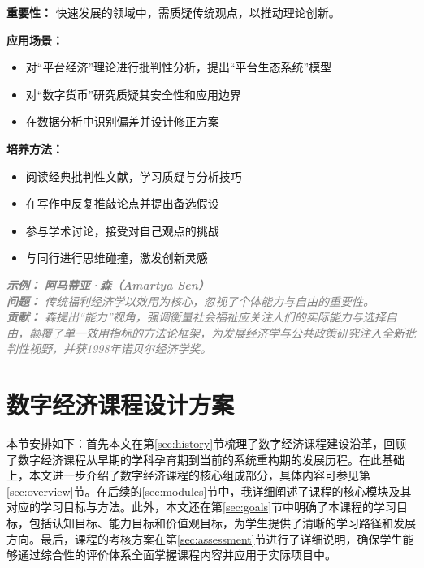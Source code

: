 \documentclass[lang=cn,12pt,a4paper]{elegantpaper}
\newcommand{\skillexample}[1]{\smallskip\noindent\textcolor{gray}{\textit{\footnotesize\textbf{示例：}} \textit{\footnotesize #1}}}
\begin{document}
\textbf{重要性：} 快速发展的领域中，需质疑传统观点，以推动理论创新。

\textbf{应用场景：} 
\begin{itemize}
    \item 对“平台经济”理论进行批判性分析，提出“平台生态系统”模型
    \item 对“数字货币”研究质疑其安全性和应用边界
    \item 在数据分析中识别偏差并设计修正方案
\end{itemize}

\textbf{培养方法：}
\begin{itemize}
    \item 阅读经典批判性文献，学习质疑与分析技巧
    \item 在写作中反复推敲论点并提出备选假设
    \item 参与学术讨论，接受对自己观点的挑战
    \item 与同行进行思维碰撞，激发创新灵感
\end{itemize}

\skillexample{%
\textbf{阿马蒂亚·森（Amartya Sen）}\\
\textbf{问题：} 传统福利经济学以效用为核心，忽视了个体能力与自由的重要性。\\
\textbf{贡献：} 森提出“能力”视角，强调衡量社会福祉应关注人们的实际能力与选择自由，颠覆了单一效用指标的方法论框架，为发展经济学与公共政策研究注入全新批判性视野，并获1998年诺贝尔经济学奖。}



\section{数字经济课程设计方案}
本节安排如下：首先本文在第\ref{sec:history}节梳理了数字经济课程建设沿革，回顾了数字经济课程从早期的学科孕育期到当前的系统重构期的发展历程。在此基础上，本文进一步介绍了数字经济课程的核心组成部分，具体内容可参见第\ref{sec:overview}节。在后续的\ref{sec:modules}节中，我详细阐述了课程的核心模块及其对应的学习目标与方法。此外，本文还在第\ref{sec:goals}节中明确了本课程的学习目标，包括认知目标、能力目标和价值观目标，为学生提供了清晰的学习路径和发展方向。最后，课程的考核方案在第\ref{sec:assessment}节进行了详细说明，确保学生能够通过综合性的评价体系全面掌握课程内容并应用于实际项目中。
\end{document}
